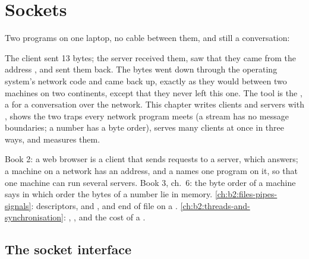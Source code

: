 \chapter{Sockets}\label{ch:b2:sockets}

Two programs on one laptop, no cable between them, and still a conversation:

\label{out:b2:sockets:hook}

The client sent 13 bytes; the server received them, saw that they came from the address , and sent
them back. The bytes went down through the operating system's network code and came back up, exactly as they would
between two machines on two continents, except that they never left this one. The tool is the \emph{}, a  for a conversation over the network. This chapter writes clients and servers with , shows the two
traps every network program meets (a stream has no message boundaries; a number has a byte order), serves many
clients at once in three ways, and measures them.

\begin{recall}
Book 2: a web browser is a client that sends requests to a server, which answers; a machine on a network has an
address, and a \emph{} names one program on it, so that one machine can run several servers. Book 3, ch.~6:
the byte order of a machine says in which order the bytes of a number lie in memory. \cref{ch:b2:files-pipes-signals}:
descriptors,  and , and end of file on a . \cref{ch:b2:threads-and-synchronisation}:
, , and the cost of a .
\end{recall}

\section{The socket interface}\label{sec:b2:sockets:interface}

